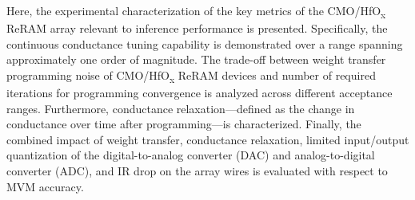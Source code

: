 Here, the experimental characterization of the key metrics of the CMO/HfO\textsubscript{\textnormal{x}} ReRAM array relevant to inference performance is presented.
Specifically, the continuous conductance tuning capability is demonstrated over a range spanning approximately one order of magnitude. The trade-off between weight transfer programming noise of CMO/HfO\textsubscript{\textnormal{x}} ReRAM devices and number of required iterations for programming convergence is analyzed across different acceptance ranges. Furthermore, conductance relaxation—defined as the change in conductance over time after programming—is characterized. Finally, the combined impact of weight transfer, conductance relaxation, limited input/output quantization of the digital-to-analog converter (DAC) and analog-to-digital converter (ADC), and IR drop on the array wires is evaluated with respect to MVM accuracy.

